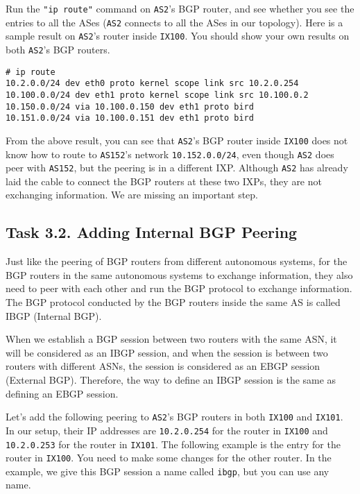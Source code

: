 Run the \texttt{"ip route"} command on \texttt{AS2}'s
BGP router, and see whether you see the entries
to all the ASes (\texttt{AS2} connects to all the ASes in
our topology).
Here is a sample result on
\texttt{AS2}'s router inside \texttt{IX100}. You
should show your own results on both \texttt{AS2}'s BGP routers.  

\begin{lstlisting}
# ip route 
10.2.0.0/24 dev eth0 proto kernel scope link src 10.2.0.254
10.100.0.0/24 dev eth1 proto kernel scope link src 10.100.0.2
10.150.0.0/24 via 10.100.0.150 dev eth1 proto bird
10.151.0.0/24 via 10.100.0.151 dev eth1 proto bird
\end{lstlisting}
 

From the above result, you can see that 
\texttt{AS2}'s BGP router inside \texttt{IX100} does not 
know how to route to \texttt{AS152}'s network \texttt{10.152.0.0/24}, even though
\texttt{AS2} does peer with \texttt{AS152}, but the peering 
is in a different IXP. 
Although \texttt{AS2} has already laid the
cable to connect the BGP routers at these two IXPs, 
they are not exchanging information. We are missing 
an important step. 


\subsection{Task 3.2. Adding Internal BGP Peering}

Just like the peering of BGP routers from different 
autonomous systems, for the BGP routers in the same 
autonomous systems to exchange information, they
also need to peer with each other and run the BGP 
protocol to exchange information. 
The BGP protocol conducted by the BGP routers 
inside the same AS is called IBGP (Internal BGP).


When we establish a BGP session between two routers with the same ASN, it will be considered
as an IBGP session, and when the session is between two routers with different ASNs, the session
is considered as an EBGP session (External BGP). 
Therefore, the way to define 
an IBGP session is the same as defining an EBGP session.  

Let's add the following peering to \texttt{AS2}'s BGP
routers in both \texttt{IX100} and \texttt{IX101}. 
In our setup, their IP addresses 
are \texttt{10.2.0.254} for the router in \texttt{IX100}
and \texttt{10.2.0.253} for the router in \texttt{IX101}. 
The following example is the entry for the router in 
\texttt{IX100}. You need to make some changes
for the other router. 
In the example, we give this BGP session a name
called \texttt{ibgp}, but you can use any name. 


